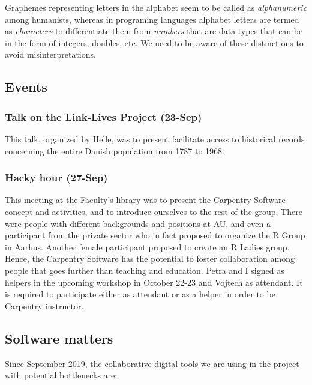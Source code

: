 \documentclass[oneside,a4paper]{memoir} %
\begin{document}
Graphemes representing letters in the alphabet seem to be called as \emph{alphanumeric} among humanists, whereas in programing languages alphabet letters are termed as \emph{characters} to differentiate them from  \emph{numbers} that are data types that can be in the form of integers, doubles, etc. We need to be aware of these distinctions to avoid misinterpretations.



\subsection{Events}

\subsubsection{Talk on the Link-Lives Project  (23-Sep)}
This talk, organized by Helle, was to present facilitate access to historical records concerning the entire Danish population from 1787 to 1968. 

\subsubsection{Hacky hour (27-Sep)}
This meeting at the Faculty's library was to present the \gls{Carpentry Software} concept and activities, and to introduce ourselves to the rest of the group. There were people with different backgrounds and positions at AU, and even a participant from the private sector who in fact proposed to organize the R Group in Aarhus. Another female participant proposed to create an R Ladies group. Hence, the Carpentry Software has the potential to foster collaboration among people that goes further than teaching and education. 
Petra and I signed as helpers in the upcoming workshop in October 22-23 and Vojtech as attendant. It is required to participate either as attendant or as a helper in order to be Carpentry instructor.


\subsection{Software matters}

Since September 2019, the collaborative digital tools we are using in the project with potential bottlenecks are:
\end{document}
